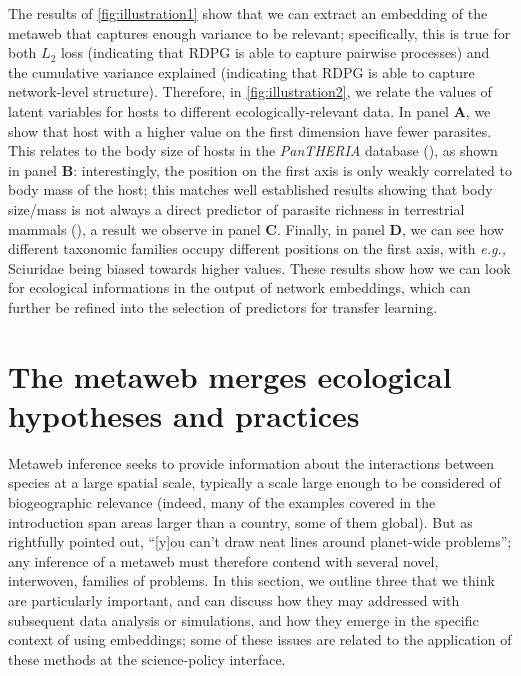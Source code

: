 \begin{refsection}
The results of \autoref{fig:illustration1} show that we can extract an embedding
of the metaweb that captures enough variance to be relevant;
specifically, this is true for both \(L_2\) loss (indicating that RDPG
is able to capture pairwise processes) and the cumulative variance
explained (indicating that RDPG is able to capture network-level
structure). Therefore, in \autoref{fig:illustration2}, we relate the values of
latent variables for hosts to different ecologically-relevant data. In
panel \textbf{A}, we show that host with a higher value on the first
dimension have fewer parasites. This relates to the body size of hosts
in the \emph{PanTHERIA} database (\cite{Jones2009Pantheria}), as shown in
panel \textbf{B}: interestingly, the position on the first axis is only
weakly correlated to body mass of the host; this matches well
established results showing that body size/mass is not always a direct
predictor of parasite richness in terrestrial mammals
(\cite{Morand1998Density}), a result we observe in panel \textbf{C}.
Finally, in panel \textbf{D}, we can see how different taxonomic
families occupy different positions on the first axis, with \emph{e.g.,}
Sciuridae being biased towards higher values. These results show how we
can look for ecological informations in the output of network
embeddings, which can further be refined into the selection of
predictors for transfer learning.

\section{The metaweb merges ecological hypotheses and
practices}\label{the-metaweb-merges-ecological-hypotheses-and-practices}

Metaweb inference seeks to provide information about the interactions
between species at a large spatial scale, typically a scale large enough
to be considered of biogeographic relevance (indeed, many of the
examples covered in the introduction span areas larger than a country,
some of them global). But as \cite{Herbert1965Dune} rightfully pointed out,
``[y]ou can't draw neat lines around planet-wide problems''; any
inference of a metaweb must therefore contend with several novel,
interwoven, families of problems. In this section, we outline three that
we think are particularly important, and can discuss how they may
addressed with subsequent data analysis or simulations, and how they
emerge in the specific context of using embeddings; some of these issues
are related to the application of these methods at the science-policy
interface.


\end{refsection}
